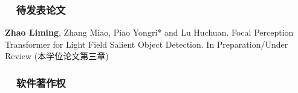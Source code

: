 
\begin{publications}


\subsubsection*{\textbf{~~待发表论文}}
\vspace{-10pt}
\begin{enumerate}[label={[\arabic*]}]
	
	
	\item
	\textbf{Zhao Liming}, Zhang Miao, Piao Yongri* and Lu Huchuan.
	Focal Perception Transformer for Light Field Salient Object Detection.
	In Preparation/Under Review
	(本学位论文第三章)
\end{enumerate}


\subsubsection*{\textbf{~~软件著作权}}
\vspace{-10pt}
\begin{enumerate}[label={[\arabic*]}]
	

\end{enumerate}
\end{publications}
